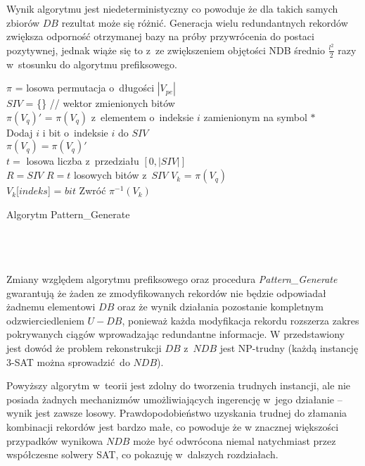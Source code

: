 Wynik algorytmu jest niedeterministyczny co powoduje że dla takich samych zbiorów $DB$ rezultat może się różnić. Generacja wielu redundantnych rekordów zwiększa odporność otrzymanej bazy na próby przywrócenia do postaci pozytywnej, jednak wiąże się to z~ze zwiększeniem objętości NDB średnio $\frac{l^2}{2}$ razy w~stosunku do algorytmu prefiksowego.


\begin{algorithm}[!htb]
    \SetAlgoLined
    $\pi$ = losowa permutacja o~długości $|V_{pe}|$\\
    $SIV$ = \{\} // wektor zmienionych bitów\\
    {
        $\pi(V_{q})'$ = $\pi(V_{q})$ z~elementem o~indeksie $i$ zamienionym na symbol $*$\\
        {
            Dodaj $i$ i bit o~indeksie $i$ do $SIV$\\
            $\pi(V_{q}) = \pi(V_{q})'$\\
        }  
    }
    $t =$ losowa liczba z~przedziału $[0, |SIV|]$\\
    {
        $R = SIV$
    }
    \Else
    {
        $R = t$ losowych bitów z~$SIV$ 
    }
    $V_k$ = $\pi(V_{q})$\\
    {
        $V_k$[$indeks$] = $bit$
    }
    Zwróć $\pi^{-1}(V_k)$ 
    
    \caption{Algorytm Pattern\_Generate}
    \label{alg:pattern-generate}
\end{algorithm}
~\\\\\\

\newpage
Zmiany względem algorytmu prefiksowego oraz procedura \textit{Pattern\_Generate} gwarantują że żaden ze zmodyfikowanych rekordów nie będzie odpowiadał żadnemu elementowi $DB$ oraz że wynik działania pozostanie kompletnym odzwierciedleniem $U - DB$,
ponieważ każda modyfikacja rekordu rozszerza zakres pokrywanych ciągów wprowadzając redundantne informacje.
W \cite{NRI-Esponda} przedstawiony jest dowód że problem rekonstrukcji $DB$ z~$NDB$ jest NP-trudny (każdą instancję 3-SAT można sprowadzić do $NDB$).

Powyższy algorytm w~teorii jest zdolny do tworzenia trudnych instancji, ale nie posiada żadnych mechanizmów umożliwiających ingerencję w~jego działanie -- wynik jest zawsze losowy.
Prawdopodobieństwo uzyskania trudnej do złamania kombinacji rekordów jest bardzo małe, co powoduje że w znacznej większości przypadków wynikowa $NDB$ może być odwrócona niemal natychmiast przez współczesne solwery SAT, co pokazuję w~dalszych rozdziałach.       


